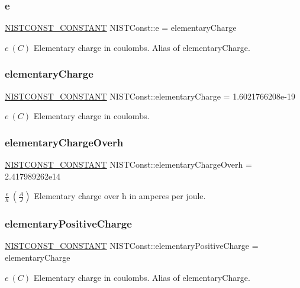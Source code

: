 \subsubsection{\texorpdfstring{e}{e}}
{\footnotesize\ttfamily \mbox{\hyperlink{group___n_i_s_t_const-_macros_ga2b0fc1d7452373f816175dd86ce26729}{N\+I\+S\+T\+C\+O\+N\+S\+T\+\_\+\+C\+O\+N\+S\+T\+A\+NT}} N\+I\+S\+T\+Const\+::e = elementary\+Charge}

$e \ (C)$ Elementary charge in coulombs. Alias of elementary\+Charge. \mbox{\label{group___n_i_s_t_const-_elementary_charge_ga8685ffddeaed87687d2ee0539b4625de}} 
\subsubsection{\texorpdfstring{elementary\+Charge}{elementaryCharge}}
{\footnotesize\ttfamily \mbox{\hyperlink{group___n_i_s_t_const-_macros_ga2b0fc1d7452373f816175dd86ce26729}{N\+I\+S\+T\+C\+O\+N\+S\+T\+\_\+\+C\+O\+N\+S\+T\+A\+NT}} N\+I\+S\+T\+Const\+::elementary\+Charge = 1.\+6021766208e-\/19}

$e \ (C)$ Elementary charge in coulombs. \mbox{\label{group___n_i_s_t_const-_elementary_charge_gae14d69d686990378677cd8072ce9873b}} 
\subsubsection{\texorpdfstring{elementary\+Charge\+Overh}{elementaryChargeOverh}}
{\footnotesize\ttfamily \mbox{\hyperlink{group___n_i_s_t_const-_macros_ga2b0fc1d7452373f816175dd86ce26729}{N\+I\+S\+T\+C\+O\+N\+S\+T\+\_\+\+C\+O\+N\+S\+T\+A\+NT}} N\+I\+S\+T\+Const\+::elementary\+Charge\+Overh = 2.\+417989262e14}

$\frac{e}{h} \ (\frac{A}{J})$ Elementary charge over h in amperes per joule. \mbox{\label{group___n_i_s_t_const-_elementary_charge_ga59f7decf2a69240cb8ed498000bfb8a2}} 
\subsubsection{\texorpdfstring{elementary\+Positive\+Charge}{elementaryPositiveCharge}}
{\footnotesize\ttfamily \mbox{\hyperlink{group___n_i_s_t_const-_macros_ga2b0fc1d7452373f816175dd86ce26729}{N\+I\+S\+T\+C\+O\+N\+S\+T\+\_\+\+C\+O\+N\+S\+T\+A\+NT}} N\+I\+S\+T\+Const\+::elementary\+Positive\+Charge = elementary\+Charge}

$e \ (C)$ Elementary charge in coulombs. Alias of elementary\+Charge. 
